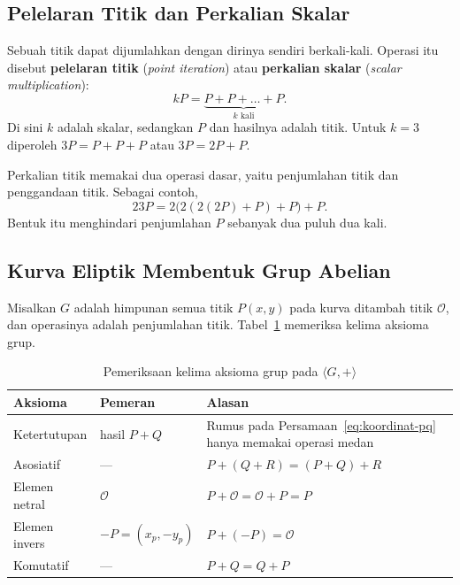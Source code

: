 \subsection{Pelelaran Titik dan Perkalian Skalar}
\label{subsec:pelelaran-titik}

Sebuah titik dapat dijumlahkan dengan dirinya sendiri berkali-kali. Operasi itu
disebut \textbf{pelelaran titik} (\textit{point iteration}) atau
\textbf{perkalian skalar} (\textit{scalar multiplication}):
\begin{equation}
kP = \underbrace{P + P + \dots + P}_{k \text{ kali}} .
\label{eq:pelelaran}
\end{equation}
Di sini $k$ adalah skalar, sedangkan $P$ dan hasilnya adalah titik. Untuk
$k = 3$ diperoleh $3P = P + P + P$ atau $3P = 2P + P$.

Perkalian titik memakai dua operasi dasar, yaitu penjumlahan titik dan
penggandaan titik. Sebagai contoh,
\[
23P = 2\bigl(2(2(2P) + P) + P\bigr) + P .
\]
Bentuk itu menghindari penjumlahan $P$ sebanyak dua puluh dua kali.

\subsection{Kurva Eliptik Membentuk Grup Abelian}
\label{subsec:grup-eliptik}

Misalkan $G$ adalah himpunan semua titik $P(x, y)$ pada kurva ditambah titik
$\mathcal{O}$, dan operasinya adalah penjumlahan titik.
Tabel~\ref{tab:aksioma-grup-eliptik} memeriksa kelima aksioma grup.

\begin{table}[htbp]
    \centering
    \caption{Pemeriksaan kelima aksioma grup pada $\langle G, + \rangle$}
    \label{tab:aksioma-grup-eliptik}
    \begin{tabularx}{\linewidth}{@{}l l
                                   >{\raggedright\arraybackslash}X@{}}
    \toprule
    \textbf{Aksioma} & \textbf{Pemeran} & \textbf{Alasan} \\
    \midrule
    Ketertutupan & hasil $P + Q$ &
    Rumus pada Persamaan~\eqref{eq:koordinat-pq} hanya memakai operasi medan \\
    \addlinespace
    Asosiatif & --- &
    $P + (Q + R) = (P + Q) + R$ \\
    \addlinespace
    Elemen netral & $\mathcal{O}$ &
    $P + \mathcal{O} = \mathcal{O} + P = P$ \\
    \addlinespace
    Elemen invers & $-P = (x_p, -y_p)$ &
    $P + (-P) = \mathcal{O}$ \\
    \addlinespace
    Komutatif & --- &
    $P + Q = Q + P$ \\
    \bottomrule
    \end{tabularx}
\end{table}

